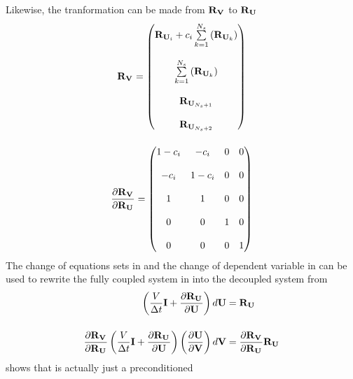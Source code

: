 \documentclass[a4paper]{report}
\begin{document}
Likewise, the tranformation can be made from $\mathbf R_{{\mathbf V}_{}}$ to $\mathbf R_{{\mathbf U}_{}}$
\begin{gather}
  \mathbf R_{{\mathbf V}_{}} =
  \begin{pmatrix}
    \mathbf R_{{\mathbf U}_{i}} + c_i \sum\limits_{k=1}^{N_s}{\left( \mathbf R_{{\mathbf U}_{k}} \right)} \\ \\
    \sum\limits_{k=1}^{N_s}{\left( \mathbf R_{{\mathbf U}_{k}} \right)} \\ \\
    \mathbf R_{{\mathbf U}_{N_s+1}} \\ \\
    \mathbf R_{{\mathbf U}_{N_s+2}}
  \end{pmatrix}
  \label{rv-to-ru} \\[12pt]
  \frac{\partial \mathbf R_{{\mathbf V}_{}}}{\partial \mathbf R_{{\mathbf U}_{}}} =
  \begin{pmatrix}
    1 - c_i & -c_i    & 0 & 0 \\ \\
    -c_i    & 1 - c_i & 0 & 0 \\ \\
    1       & 1       & 0 & 0 \\ \\
    0       & 0       & 1 & 0 \\ \\
    0       & 0       & 0 & 1
  \end{pmatrix}
  \label{drvdru}
\end{gather}
The change of equations sets in  and the change of
dependent variable in  can be used to rewrite the fully coupled
system in  into the decoupled system from 
\begin{equation}
  \begin{aligned}
    \left( \frac{V}{\Delta t} \mathbf I + \frac{\partial \mathbf R_{{\mathbf U}_{}}}{\partial \mathbf U} \right) d \mathbf U &= \mathbf R_{{\mathbf U}_{}}
    \\[12pt]
    \frac{\partial \mathbf R_{{\mathbf V}_{}}}{\partial \mathbf R_{{\mathbf U}_{}}}
    \left( \frac{V}{\Delta t} \mathbf I + \frac{\partial \mathbf R_{{\mathbf U}_{}}}{\partial \mathbf U} \right)
    \left( \frac{\partial \mathbf U}{\partial \mathbf V} \right) d \mathbf V
    &= 
    \frac{\partial \mathbf R_{{\mathbf V}_{}}}{\partial \mathbf R_{{\mathbf U}_{}}} \mathbf R_{{\mathbf U}_{}}
  \end{aligned}
  \label{fc-to-dc-form}
\end{equation}
 shows that  is actually just a preconditioned
\end{document}
